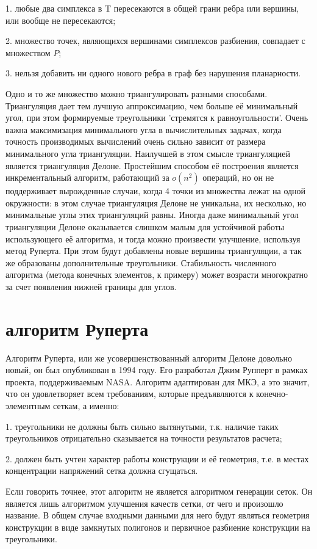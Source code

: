 \documentclass[14pt]{extreport}
\begin{document}
	1. любые два симплекса в T пересекаются в общей грани ребра или вершины, или вообще не пересекаются;

	2. множество точек, являющихся вершинами симплексов разбиения, совпадает с множеством $P$;
	
	3. нельзя добавить ни одного нового ребра в граф без нарушения планарности.

Одно и то же множество можно триангулировать разными способами. Триангуляция дает тем лучшую аппроксимацию, чем больше её минимальный угол, при этом формируемые треугольники 'стремятся к равноугольности'. Очень важна максимизация минимального угла в вычислительных задачах, когда точность производимых вычислений очень сильно зависит от размера минимального угла триангуляции. Наилучшей в этом смысле триангуляцией является триангуляция Делоне. Простейшим способом её построения является инкрементальный алгоритм, работающий за $o(n^2)$ операций, но он не поддерживает вырожденные случаи, когда 4 точки из множества лежат на одной окружности: в этом случае триангуляция Делоне не уникальна, их несколько, но минимальные углы этих триангуляций равны. Иногда даже минимальный угол триангуляции Делоне оказывается слишком малым для устойчивой работы использующего её алгоритма, и тогда можно произвести улучшение, используя метод Руперта. При этом будут добавлены новые вершины триангуляции, а так же образованы дополнительные треугольники. Стабильность численного алгоритма (метода конечных элементов, к примеру) может возрасти многократно за счет появления нижней границы для углов. 

\section{алгоритм Руперта}

Алгоритм Руперта, или же усовершенствованный алгоритм Делоне довольно новый, он был опубликован в 1994 году. Его разработал Джим Рупперт в рамках проекта, поддерживаемым NASA. Алгоритм адаптирован для МКЭ, а это значит, что он удовлетворяет всем требованиям, которые предъявляются к конечно-элементным сеткам, а именно:

1. треугольники не должны быть сильно вытянутыми, т.к. наличие таких треугольников отрицательно сказывается на точности результатов расчета;

2. должен быть учтен характер работы конструкции и её геометрия, т.е. в местах концентрации напряжений сетка должна сгущаться.


Если говорить точнее, этот алгоритм не является алгоритмом генерации сеток. Он является лишь алгоритмом улучшения качеств сетки, от чего и произошло название. В общем случае входными данными для него будут являться геометрия конструкции в виде замкнутых полигонов и первичное разбиение конструкции на треугольники. 
\end{document}
